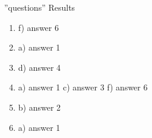 \documentclass[a4paper,10pt]{article}
\begin{document}
\huge ''questions'' Results 
\large
\begin{multicols}{2}

\begin{enumerate}
\item f) answer 6 
\item a) answer 1 
\item d) answer 4 
\item a) answer 1 c) answer 3 f) answer 6 
\item b) answer 2 
\item a) answer 1 
\end{enumerate}
\end{multicols}
\end{document}
